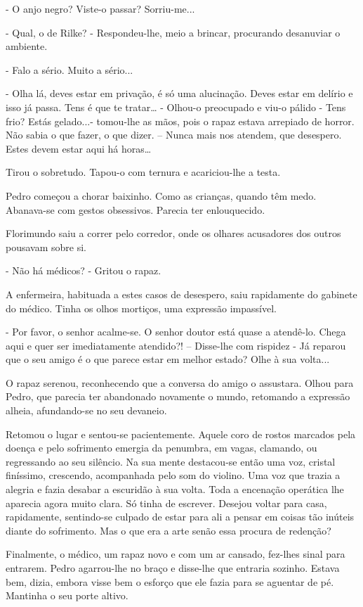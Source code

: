 - O anjo negro? Viste-o passar? Sorriu-me...

- Qual, o de Rilke? - Respondeu-lhe, meio a brincar, procurando
desanuviar o ambiente.

- Falo a sério. Muito a sério...

- Olha lá, deves estar em privação, é só uma alucinação. Deves estar em
delírio e isso já passa. Tens é que te tratar\ldots{} - Olhou-o
preocupado e viu-o pálido - Tens frio? Estás gelado...- tomou-lhe as
mãos, pois o rapaz estava arrepiado de horror. Não sabia o que fazer, o
que dizer. -- Nunca mais nos atendem, que desespero. Estes devem estar
aqui há horas\ldots{}

Tirou o sobretudo. Tapou-o com ternura e acariciou-lhe a testa.

Pedro começou a chorar baixinho. Como as crianças, quando têm medo.
Abanava-se com gestos obsessivos. Parecia ter enlouquecido.

Florimundo saiu a correr pelo corredor, onde os olhares acusadores dos
outros pousavam sobre si.

- Não há médicos? - Gritou o rapaz.

A enfermeira, habituada a estes casos de desespero, saiu rapidamente do
gabinete do médico. Tinha os olhos mortiços, uma expressão impassível.

- Por favor, o senhor acalme-se. O senhor doutor está quase a atendê-lo.
Chega aqui e quer ser imediatamente atendido?! -- Disse-lhe com rispidez
- Já reparou que o seu amigo é o que parece estar em melhor estado? Olhe
à sua volta...

O rapaz serenou, reconhecendo que a conversa do amigo o assustara. Olhou
para Pedro, que parecia ter abandonado novamente o mundo, retomando a
expressão alheia, afundando-se no seu devaneio.

Retomou o lugar e sentou-se pacientemente. Aquele coro de rostos
marcados pela doença e pelo sofrimento emergia da penumbra, em vagas,
clamando, ou regressando ao seu silêncio. Na sua mente destacou-se então
uma voz, cristal finíssimo, crescendo, acompanhada pelo som do violino.
Uma voz que trazia a alegria e fazia desabar a escuridão à sua volta.
Toda a encenação operática lhe aparecia agora muito clara. Só tinha de
escrever. Desejou voltar para casa, rapidamente, sentindo-se culpado de
estar para ali a pensar em coisas tão inúteis diante do sofrimento. Mas
o que era a arte senão essa procura de redenção?

Finalmente, o médico, um rapaz novo e com um ar cansado, fez-lhes sinal
para entrarem. Pedro agarrou-lhe no braço e disse-lhe que entraria
sozinho. Estava bem, dizia, embora visse bem o esforço que ele fazia
para se aguentar de pé. Mantinha o seu porte altivo.

